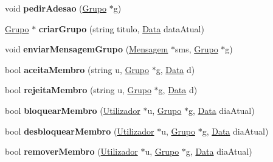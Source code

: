 \begin{DoxyCompactItemize}
\item 
\hypertarget{class_utilizador_aba7f8c8306ae34617d5af06678a8cd12}{}void {\bfseries pedir\+Adesao} (\hyperlink{class_grupo}{Grupo} $\ast$g)\label{class_utilizador_aba7f8c8306ae34617d5af06678a8cd12}

\item 
\hypertarget{class_utilizador_a68471f49e5980a4bf43d48b7ce2118a3}{}\hyperlink{class_grupo}{Grupo} $\ast$ {\bfseries criar\+Grupo} (string titulo, \hyperlink{class_data}{Data} data\+Atual)\label{class_utilizador_a68471f49e5980a4bf43d48b7ce2118a3}

\item 
\hypertarget{class_utilizador_af58be0db512c246659d4fc5210bdc081}{}void {\bfseries enviar\+Mensagem\+Grupo} (\hyperlink{class_mensagem}{Mensagem} $\ast$sms, \hyperlink{class_grupo}{Grupo} $\ast$g)\label{class_utilizador_af58be0db512c246659d4fc5210bdc081}

\item 
\hypertarget{class_utilizador_ab14fba96c23d0b6e10fe3c36c80490c7}{}bool {\bfseries aceita\+Membro} (string u, \hyperlink{class_grupo}{Grupo} $\ast$g, \hyperlink{class_data}{Data} d)\label{class_utilizador_ab14fba96c23d0b6e10fe3c36c80490c7}

\item 
\hypertarget{class_utilizador_ab55a0e6e25616dac0a31ec6e103a987d}{}bool {\bfseries rejeita\+Membro} (string u, \hyperlink{class_grupo}{Grupo} $\ast$g, \hyperlink{class_data}{Data} d)\label{class_utilizador_ab55a0e6e25616dac0a31ec6e103a987d}

\item 
\hypertarget{class_utilizador_a70f4f75f649f4ca5aefebc99e556a20b}{}bool {\bfseries bloquear\+Membro} (\hyperlink{class_utilizador}{Utilizador} $\ast$u, \hyperlink{class_grupo}{Grupo} $\ast$g, \hyperlink{class_data}{Data} dia\+Atual)\label{class_utilizador_a70f4f75f649f4ca5aefebc99e556a20b}

\item 
\hypertarget{class_utilizador_a7424cd944ea535338280e821666768f7}{}bool {\bfseries desbloquear\+Membro} (\hyperlink{class_utilizador}{Utilizador} $\ast$u, \hyperlink{class_grupo}{Grupo} $\ast$g, \hyperlink{class_data}{Data} dia\+Atual)\label{class_utilizador_a7424cd944ea535338280e821666768f7}

\item 
\hypertarget{class_utilizador_a05e62bd42a3e3a324cea8d9c998c2391}{}bool {\bfseries remover\+Membro} (\hyperlink{class_utilizador}{Utilizador} $\ast$u, \hyperlink{class_grupo}{Grupo} $\ast$g, \hyperlink{class_data}{Data} dia\+Atual)\label{class_utilizador_a05e62bd42a3e3a324cea8d9c998c2391}

\end{DoxyCompactItemize}
